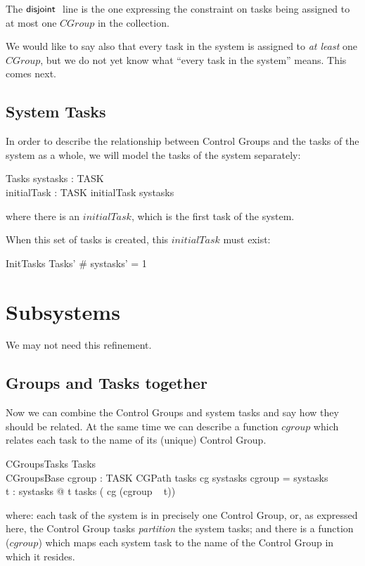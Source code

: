 \documentclass[a4paper,twoside,12pt]{article}
\begin{document}
The ${\mathsf{disjoint}}\;$ line is the one expressing the constraint on tasks being assigned to at most one $CGroup$ in the collection.

We would like to say also that every task in the system is assigned to \emph{at least} one $CGroup$, but we do not yet know what ``every task in the system'' means. This comes next.

\subsection{System Tasks}
In order to describe the relationship between Control Groups and the tasks of the system as a whole, we will model the tasks of the system separately:

\begin{schema}{Tasks}
systasks : \finset TASK \\
initialTask : TASK
\where
initialTask \in systasks
\end{schema}
where there is an $initialTask$, which is the first task of the system.

When this set of tasks is created, this $initialTask$ must exist:

\begin{schema}{InitTasks}
Tasks'
\where
\# systasks' = 1
\end{schema}
\section{Subsystems}
We may not need this refinement.

\subsection{Groups and Tasks together}
Now we can combine the Control Groups and system tasks and say how they should be related. At the same time we can describe a function $cgroup$ which relates each task to the name of its (unique) Control Group.

\begin{schema}{CGroupsTasks}
Tasks \\
CGroupsBase
\also
cgroup : TASK \ffun CGPath
\where
tasks \circ cg \partition systasks
\also
\dom cgroup = systasks \\
\forall t : systasks @ t \in tasks ( cg (cgroup ~ t))
\end{schema}
where: each task of the system is in precisely one Control Group, or, as expressed here, the Control Group tasks \emph{partition} the system tasks; and there is a function ($cgroup$) which maps each system task to the name of the Control Group in which it resides.
\end{document}
